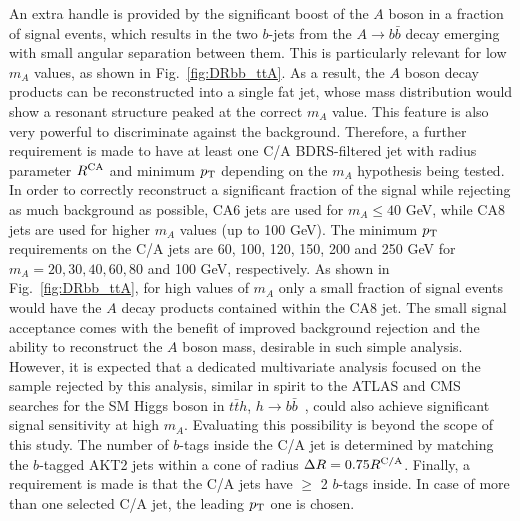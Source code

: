 \documentclass[preprintnumbers,superscriptaddress,nofootinbib,aps,prd,floatfix]{revtex4}
\newcommand{\pt}{p_{\rm{T}}}
\begin{document}
An extra handle is provided by the significant boost of the $A$ boson in a fraction of signal 
events, which results in the two $b$-jets from the $A \to b\bar{b}$ decay emerging with small angular separation between them.
This is particularly relevant for low $m_A$ values, as shown in Fig.~\ref{fig:DRbb_ttA}.
As a result, the $A$ boson decay products can be reconstructed into a single fat jet, whose mass distribution would show a 
resonant structure peaked at the correct $m_A$ value. This feature is also very powerful to discriminate against the background.
Therefore, a further requirement is made to have at least one C/A BDRS-filtered jet with radius parameter $R^{\rm CA}$ and minimum $\pt$
depending on the $m_A$ hypothesis being tested. In order to correctly reconstruct a significant fraction of the signal while rejecting as 
much background as possible,  CA6 jets are used for $m_A \leq 40$ GeV, while CA8 jets are used for higher $m_A$ values (up to 100 GeV). 
The minimum $\pt$ requirements on the C/A jets are 60, 100, 120, 150, 200 and 250 GeV for
$m_A=20, 30, 40, 60, 80$ and 100 GeV, respectively. 
As shown in Fig.~\ref{fig:DRbb_ttA}, for high values of $m_A$ only a small fraction of signal events would have the $A$ decay products contained
within the CA8 jet. The small signal acceptance comes with the benefit of improved background rejection and
the ability to reconstruct the $A$ boson mass, desirable in such simple analysis. However, it is expected that a dedicated multivariate 
analysis focused on the sample rejected by this analysis, similar in spirit to the ATLAS and CMS searches for the SM Higgs boson in 
$t\bar{t} h$, $h \to b\bar{b}$~\cite{Aad:2015gra,Khachatryan:2015ila}, could also achieve significant signal sensitivity at high $m_A$. 
Evaluating this possibility is beyond the scope of this study.
The number of $b$-tags inside the C/A jet is determined by
matching the $b$-tagged AKT2 jets within a cone of radius $\Delta R =0.75 R^{\rm C/A}$. 
Finally, a requirement is made is that the C/A jets have $\geq$ 2 $b$-tags inside. In case of more than one selected C/A jet,
the leading $\pt$ one is chosen. 
\end{document}
